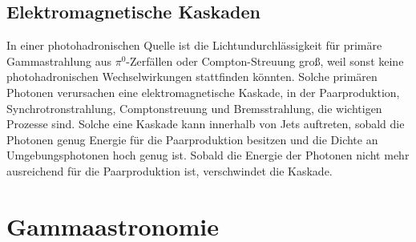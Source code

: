 
\subsection{Elektromagnetische Kaskaden}
In einer photohadronischen Quelle ist die Lichtundurchlässigkeit für primäre Gammastrahlung aus $\pi^0$-Zerfällen oder Compton-Streuung groß, weil sonst keine photohadronischen Wechselwirkungen stattfinden könnten.
Solche primären Photonen verursachen eine elektromagnetische Kaskade, in der Paarproduktion, Synchrotronstrahlung, Comptonstreuung und Bremsstrahlung, die wichtigen Prozesse sind.
Solche eine Kaskade kann innerhalb von Jets auftreten, sobald die Photonen genug Energie für die Paarproduktion besitzen und die Dichte an Umgebungsphotonen hoch genug ist.
Sobald die Energie der Photonen nicht mehr ausreichend für die Paarproduktion ist, verschwindet die Kaskade.\cite{RelativisticJets}


\section{Gammaastronomie}
\label{sec:Gammaastronomie}


